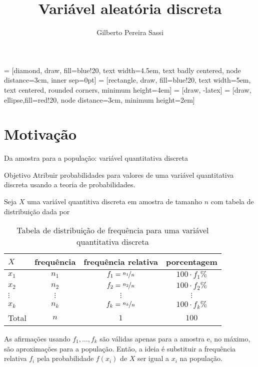 \documentclass[9pt]{beamer}
\date{}
\title[Probabilidade]{Variável aleatória discreta}
\author[Gilberto Sassi]{Gilberto Pereira Sassi}
\institute[IME -- UFBA]{Universidade Federal da Bahia \\ Instituto de Matem\'{a}tica e Estat\'{i}stica\\ Departamento de Estat\'{i}stica }
\begin{document}
	
 = [diamond, draw, fill=blue!20, 
text width=4.5em, text badly centered, node distance=3cm, inner sep=0pt]
 = [rectangle, draw, fill=blue!20, 
text width=5em, text centered, rounded corners, minimum height=4em]
 = [draw, -latex]
 = [draw, ellipse,fill=red!20, node distance=3cm,
minimum height=2em]
	
\begin{frame}{}
	\maketitle
\end{frame}

\section{Motivação}

\begin{frame}{Da amostra para a população: variável quantitativa discreta}

\begin{block}{Objetivo}
	Atribuir probabilidades para valores de uma variável quantitativa discreta usando a teoria de probabilidades.
\end{block}

Seja $X$ uma variável quantitiva discreta em amostra de tamanho $n$ com tabela de distribuição dada por

{\small
\begin{table}
 \centering
 \caption{Tabela de distribuição de frequência para uma variável quantitativa discreta}
 \begin{tabular}{lccc}
  \toprule[0.05cm]
  $X$ & frequência & frequência relativa & porcentagem \\
  \midrule[0.05cm]
  $x_1$ & $n_1$ & $f_1=\nicefrac{n_1}{n}$ & $100 \cdot f_1 \%$\\
  $x_2$ & $n_2$ & $f_2=\nicefrac{n_2}{n}$ & $100 \cdot f_2 \%$\\
  $\vdots$ & $\vdots$ & $\vdots$ & $\vdots$ \\
  $x_k$ & $n_k$ & $f_k=\nicefrac{n_k}{n}$ & $100 \cdot f_k \%$\\
  \midrule[0.05cm]
  Total & $n$ & $1$ & $100$ \\ \bottomrule[0.05cm]
 \end{tabular}
\end{table}
}

As afirmações usando $f_1, \dots, f_k$ são válidas apenas para a amostra e, no máximo, são aproximações para a população. Então, a ideia é substituir a frequência relativa $f_i$ 
pela probabilidade $f(x_i)$ de $X$ ser igual a $x_i$ na população.
\end{frame}
\end{document}
